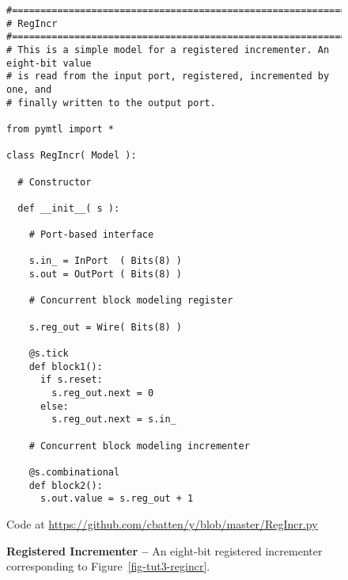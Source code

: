 
\begin{figure}

  \begin{lstlisting}[xleftmargin={0.9in}]
#=========================================================================
# RegIncr
#=========================================================================
# This is a simple model for a registered incrementer. An eight-bit value
# is read from the input port, registered, incremented by one, and
# finally written to the output port.

from pymtl import *

class RegIncr( Model ):

  # Constructor

  def __init__( s ):

    # Port-based interface

    s.in_ = InPort  ( Bits(8) )
    s.out = OutPort ( Bits(8) )

    # Concurrent block modeling register

    s.reg_out = Wire( Bits(8) )

    @s.tick
    def block1():
      if s.reset:
        s.reg_out.next = 0
      else:
        s.reg_out.next = s.in_

    # Concurrent block modeling incrementer

    @s.combinational
    def block2():
      s.out.value = s.reg_out + 1
\end{lstlisting}

  \centerline{\small Code at
    \url{https://github.com/cbatten/y/blob/master/RegIncr.py}}

  \caption{\textbf{Registered Incrementer --} An eight-bit registered
    incrementer corresponding to Figure~\ref{fig-tut3-regincr}.}
  \label{code-tut3-regincr}

\end{figure}

